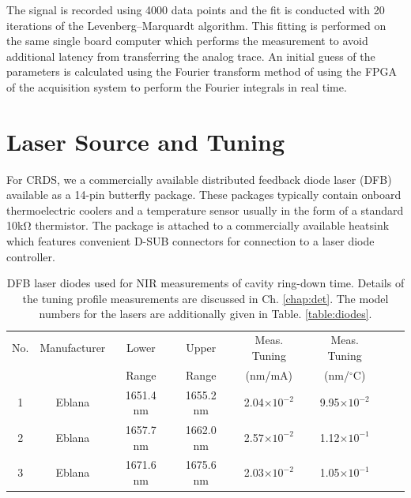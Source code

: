\documentclass[8pt,a4paper]{report}
\begin{document}
	The signal is recorded using 4000 data points and the fit is conducted with 20 iterations
	of the Levenberg–Marquardt algorithm. This fitting is performed on the same single board
	computer which performs the measurement to avoid additional latency from transferring
	the analog trace. An initial guess of the parameters is calculated using the Fourier transform
	method of \cite{fourier_transform_exponentialDecay} using the FPGA of the acquisition system to perform the Fourier integrals
	in real time.
	
	\section{Laser Source and Tuning}
	For CRDS, we a commercially available distributed feedback diode laser (DFB) available as a 14-pin butterfly package. These packages typically contain onboard thermoelectric coolers and a temperature sensor usually in the form of a standard 10k$\mathrm{\Omega}$ thermistor. The package is attached to a commercially available heatsink which features convenient D-SUB connectors for connection to a laser diode controller.
	
	\begin{table}[H]
		\begin{center}
			\caption{DFB laser diodes used for NIR measurements of cavity ring-down time. Details of the tuning profile measurements are discussed in Ch. \ref{chap:det}. The model numbers for the lasers are additionally given in Table. \ref{table:diodes}.} \label{table:crds_diodes}
			\begin{tabular}{|c|c|c|c|c|c|c|c|}
				\hline
				No. & Manufacturer & Lower & Upper  & Meas. Tuning & Meas. Tuning \\
				& & Range & Range & (nm/mA) & (nm/$^\circ$C) \\
				\hline
				1 & Eblana & 1651.4 nm & 1655.2 nm & 2.04$\times10^{-2}$ & 9.95$\times10^{-2}$ \\
				\hline
				2 & Eblana & 1657.7 nm & 1662.0 nm & 2.57$\times10^{-2}$ & 1.12$\times10^{-1}$ \\
				\hline
				3 & Eblana & 1671.6 nm & 1675.6 nm & 2.03$\times10^{-2}$ & 1.05$\times10^{-1}$ \\
				\hline
			\end{tabular}
		\end{center}
	\end{table}
	
\end{document}

